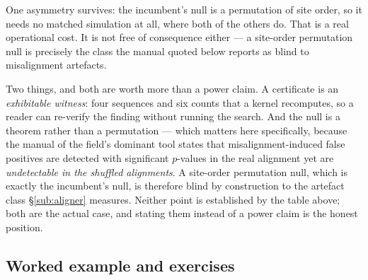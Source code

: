 \begin{numerics}
One asymmetry survives: the incumbent's null is a permutation of site order, so
it needs no matched simulation at all, where both of the others do. That is a
real operational cost. It is not free of consequence either --- a site-order
permutation null is precisely the class the manual quoted below reports as blind
to misalignment artefacts.
\end{numerics}

\begin{remark}
Two things, and both are worth more than a power claim. A certificate is an
\emph{exhibitable witness}: four sequences and six counts that a kernel
recomputes, so a reader can re-verify the finding without running the search.
And the null is a theorem rather than a permutation --- which matters here
specifically, because the manual of the field's dominant tool states that
misalignment-induced false positives are detected with significant $p$-values in
the real alignment yet are \emph{undetectable in the shuffled alignments}. A
site-order permutation null, which is exactly the incumbent's null, is therefore
blind by construction to the artefact class \S\ref{sub:aligner} measures.
Neither point is established by the table above; both are the actual case, and
stating them instead of a power claim is the honest position.
\end{remark}

\subsection{Worked example and exercises}

